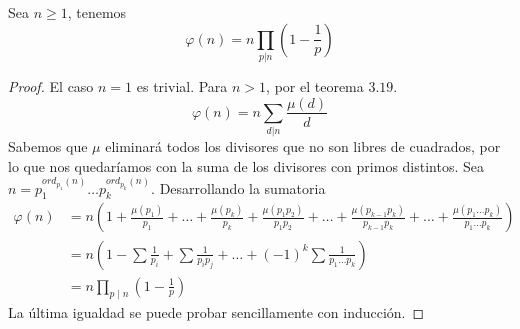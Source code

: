 \documentclass[main.tex]{subfiles}
\begin{document}
\begin{theorem}
Sea $n \geq 1$, tenemos
$$\varphi(n) = n \prod_{p | n}\left(1 - \frac{1}{p}\right)$$
\end{theorem}
\begin{proof}
El caso $n = 1$ es trivial. Para $n > 1$, por el teorema $3.19$.
$$\varphi(n) = n \sum_{d|n} \frac{\mu(d)}{d}$$
Sabemos que $\mu$ eliminar\'a todos los divisores que no son libres de cuadrados, por lo que nos quedar\'iamos con la suma de los divisores con primos distintos. Sea $n = p_1^{ord_{p_1}(n)}\dots p_k^{ord_{p_k}(n)}$. Desarrollando la sumatoria
\begin{align*}
    \varphi(n) &= n\left(1 + \frac{\mu(p_1)}{p_1} + \dots + \frac{\mu(p_k)}{p_k} + \frac{\mu(p_1 p_2)}{p_1 p_2} + \dots + \frac{\mu(p_{k-1} p_k)}{p_{k-1} p_k} + \dots + \frac{\mu(p_1 \dots p_k)}{p_1 \dots p_k}\right)\\
    &= n\left(1 - \sum\frac{1}{p_i} + \sum\frac{1}{p_i p_j} + \dots + (-1)^k\sum\frac{1}{p_1 \dots p_k}\right)\\
    &= n\prod_{p \mid n}\left(1 - \frac{1}{p}\right)
\end{align*}
La \'ultima igualdad se puede probar sencillamente con inducci\'on.
\end{proof}
\end{document}

